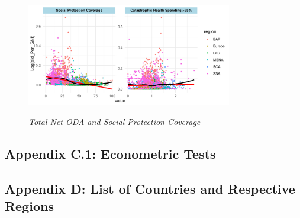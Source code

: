 \begin{figure}[H]
\captionsetup{justification=justified,singlelinecheck=false}
\caption{\textit{Total Net ODA and Social Protection Coverage}}
   \centering \includegraphics[width = 0.8\textwidth]{Figures/ODA_against_Hth/Soc_Prot_aid_Per_GNI_plt.pdf}
   \label{Fig::Social_Prot_Total_ODA}
\end{figure}



\subsection*{Appendix C.1: \quad Econometric Tests}





%



%
%

 

\subsection*{Appendix D: List of Countries and Respective Regions}


